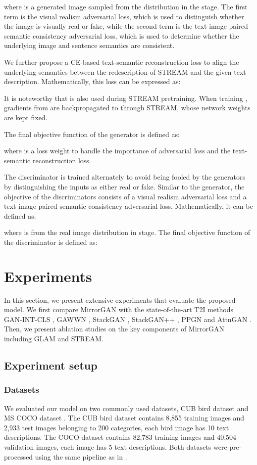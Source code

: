 \documentclass[10pt,twocolumn,letterpaper]{article}
\begin{document}
where  is a generated image sampled from the distribution  in the  stage. The first term is the visual realism adversarial loss, which is used to distinguish whether the image is visually real or fake, while the second term is the text-image paired semantic consistency adversarial loss, which is used to determine whether the underlying image and sentence semantics are consistent.

We further propose a CE-based text-semantic reconstruction loss to align the underlying semantics between the redescription of STREAM and the given text description. Mathematically, this loss can be expressed as: 

It is noteworthy that  is also used during STREAM pretraining. When training , gradients from  are backpropagated to  through STREAM, whose network weights are kept fixed.

The final objective function of the generator is defined as: 

where  is a loss weight to handle the importance of adversarial loss and the text-semantic reconstruction loss.

The discriminator  is trained alternately to avoid being fooled by the generators by distinguishing the inputs as either real or fake. Similar to the generator, the objective of the discriminators consists of a visual realism adversarial loss and a text-image paired semantic consistency adversarial loss. Mathematically, it can be defined as:

where  is from the real image distribution  in  stage. 
The final objective function of the discriminator is defined as:


\section{Experiments}
In this section, we present extensive experiments that evaluate the proposed model. 
We first compare MirrorGAN with the state-of-the-art T2I methods GAN-INT-CLS \cite{reed2016generative}, GAWWN \cite{reed2016learning}, StackGAN \cite{zhang2017stackgan}, StackGAN++ \cite{zhang2017stackgan++}, PPGN \cite{nguyen2017plug} and AttnGAN \cite{xu2017attngan}. 
Then, we present ablation studies on the key components of MirrorGAN including GLAM and STREAM.

\subsection{Experiment setup}
\subsubsection{Datasets}
We evaluated our model on two commonly used datasets, CUB bird dataset \cite{wah2011caltech} and MS COCO dataset \cite{lin2014microsoft}. The CUB bird dataset contains 8,855 training images and 2,933 test images belonging to 200 categories, each bird image has 10 text descriptions. The COCO dataset contains 82,783 training images and 40,504 validation images, each image has 5 text descriptions. Both datasets were pre-processed using the same pipeline as in \cite{zhang2017stackgan,xu2017attngan}.
\end{document}
